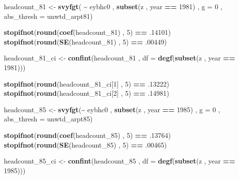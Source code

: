 \documentclass[
]{book}
\newenvironment{Shaded}{\begin{snugshade}}{\end{snugshade}}
\newcommand{\AttributeTok}[1]{\textcolor[rgb]{0.13,0.29,0.53}{#1}}
\newcommand{\DecValTok}[1]{\textcolor[rgb]{0.00,0.00,0.81}{#1}}
\newcommand{\FunctionTok}[1]{\textcolor[rgb]{0.13,0.29,0.53}{\textbf{#1}}}
\newcommand{\NormalTok}[1]{#1}
\newcommand{\OtherTok}[1]{\textcolor[rgb]{0.56,0.35,0.01}{#1}}
\newcommand{\SpecialCharTok}[1]{\textcolor[rgb]{0.81,0.36,0.00}{\textbf{#1}}}
\begin{document}
\begin{Shaded}
\begin{Highlighting}[]
\NormalTok{headcount\_81 }\OtherTok{\textless{}{-}}
  \FunctionTok{svyfgt}\NormalTok{( }\SpecialCharTok{\textasciitilde{}}\NormalTok{ eybhc0 ,}
          \FunctionTok{subset}\NormalTok{(z , year }\SpecialCharTok{==} \DecValTok{1981}\NormalTok{) ,}
          \AttributeTok{g =} \DecValTok{0}\NormalTok{ ,}
          \AttributeTok{abs\_thresh =}\NormalTok{ unwtd\_arpt81)}

\FunctionTok{stopifnot}\NormalTok{(}\FunctionTok{round}\NormalTok{(}\FunctionTok{coef}\NormalTok{(headcount\_81) , }\DecValTok{5}\NormalTok{) }\SpecialCharTok{==}\NormalTok{ .}\DecValTok{14101}\NormalTok{)}
\FunctionTok{stopifnot}\NormalTok{(}\FunctionTok{round}\NormalTok{(}\FunctionTok{SE}\NormalTok{(headcount\_81) , }\DecValTok{5}\NormalTok{) }\SpecialCharTok{==}\NormalTok{ .}\DecValTok{00449}\NormalTok{)}

\NormalTok{headcount\_81\_ci }\OtherTok{\textless{}{-}}
  \FunctionTok{confint}\NormalTok{(headcount\_81 , }\AttributeTok{df =} \FunctionTok{degf}\NormalTok{(}\FunctionTok{subset}\NormalTok{(z , year }\SpecialCharTok{==} \DecValTok{1981}\NormalTok{)))}

\FunctionTok{stopifnot}\NormalTok{(}\FunctionTok{round}\NormalTok{(headcount\_81\_ci[}\DecValTok{1}\NormalTok{] , }\DecValTok{5}\NormalTok{) }\SpecialCharTok{==}\NormalTok{ .}\DecValTok{13222}\NormalTok{)}
\FunctionTok{stopifnot}\NormalTok{(}\FunctionTok{round}\NormalTok{(headcount\_81\_ci[}\DecValTok{2}\NormalTok{] , }\DecValTok{5}\NormalTok{) }\SpecialCharTok{==}\NormalTok{ .}\DecValTok{14981}\NormalTok{)}

\NormalTok{headcount\_85 }\OtherTok{\textless{}{-}}
  \FunctionTok{svyfgt}\NormalTok{(}\SpecialCharTok{\textasciitilde{}}\NormalTok{ eybhc0 ,}
         \FunctionTok{subset}\NormalTok{(z , year }\SpecialCharTok{==} \DecValTok{1985}\NormalTok{) ,}
         \AttributeTok{g =} \DecValTok{0}\NormalTok{ ,}
         \AttributeTok{abs\_thresh =}\NormalTok{ unwtd\_arpt85)}


\FunctionTok{stopifnot}\NormalTok{(}\FunctionTok{round}\NormalTok{(}\FunctionTok{coef}\NormalTok{(headcount\_85) , }\DecValTok{5}\NormalTok{) }\SpecialCharTok{==}\NormalTok{ .}\DecValTok{13764}\NormalTok{)}
\FunctionTok{stopifnot}\NormalTok{(}\FunctionTok{round}\NormalTok{(}\FunctionTok{SE}\NormalTok{(headcount\_85) , }\DecValTok{5}\NormalTok{) }\SpecialCharTok{==}\NormalTok{ .}\DecValTok{00465}\NormalTok{)}

\NormalTok{headcount\_85\_ci }\OtherTok{\textless{}{-}}
  \FunctionTok{confint}\NormalTok{(headcount\_85 , }\AttributeTok{df =} \FunctionTok{degf}\NormalTok{(}\FunctionTok{subset}\NormalTok{(z , year }\SpecialCharTok{==} \DecValTok{1985}\NormalTok{)))}


\end{Highlighting}
\end{Shaded}
\end{document}
